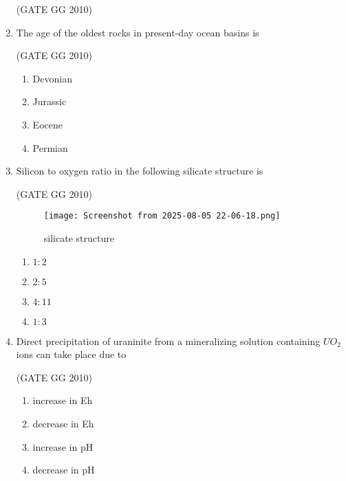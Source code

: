 \documentclass[journal]{IEEEtran}
\begin{document}
\begin{enumerate}[start=1]
\hfill{(GATE GG 2010)}


\begin{enumerate}
\end{enumerate}

\item The age of the oldest rocks in present-day ocean basins is

\hfill{(GATE GG 2010)}

\begin{enumerate}
    \item Devonian
    \item Jurassic
    \item Eocene
    \item Permian
\end{enumerate}
\item Silicon to oxygen ratio in the following silicate structure is

\hfill{(GATE GG 2010)}

\begin{figure}[H]
    \centering
    \texttt{[image: Screenshot from 2025-08-05 22-06-18.png]}
    \caption{silicate structure}
    \label{fig:silicate}
\end{figure}
\begin{enumerate}
    \item $1:2$
    \item $2:5$
    \item $4:11$
    \item $1:3$
\end{enumerate}

\item Direct precipitation of uraninite from a mineralizing solution containing  $UO_2$ions can take place due to

\hfill{(GATE GG 2010)}

\begin{enumerate}
    \item increase in Eh
    \item decrease in Eh
    \item increase in pH
    \item  decrease in pH
\end{enumerate}


\end{enumerate}
\end{document}
